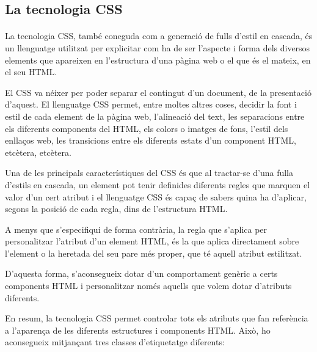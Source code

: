 \subsection{La tecnologia CSS}

    \paragraph{}
    La tecnologia CSS, també coneguda com a generació de fulls d'estil en cascada, és un llenguatge utilitzat per explicitar com ha de ser l'aspecte i forma dels diversos elements que apareixen en l’estructura d’una pàgina web o el que és el mateix, en el seu HTML.

    El CSS va néixer per poder separar el contingut d'un document, de la presentació d'aquest. El llenguatge CSS permet, entre moltes altres coses, decidir la font i estil de cada element de la pàgina web, l'alineació del text, les separacions entre els diferents components del HTML, els colors o imatges de fons, l'estil dels enllaços web, les transicions entre els diferents estats d’un component HTML, etcètera, etcètera.

    Una de les principals característiques del CSS és que al tractar-se d'una fulla d'estils en cascada, un element pot tenir definides diferents regles que marquen el valor d’un cert atribut i el llenguatge CSS és capaç de sabers quina ha d’aplicar, segons la posició de cada regla, dins de l'estructura HTML.

    A menys que s’especifiqui de forma contrària, la regla que s’aplica per per\-so\-na\-lit\-zar l'atribut d'un element HTML, és la que aplica directament sobre l’element o la heretada del seu pare més proper, que té aquell atribut estilitzat.

    D'aquesta forma, s'aconsegueix dotar d'un comportament genèric a certs components HTML i personalitzar només aquells que volem dotar d'atributs diferents.

    En resum, la tecnologia CSS permet controlar tots els atributs que fan referència a l'aparença de les diferents estructures i components HTML. Això, ho aconsegueix mitjançant tres classes d'etiquetatge diferents:

